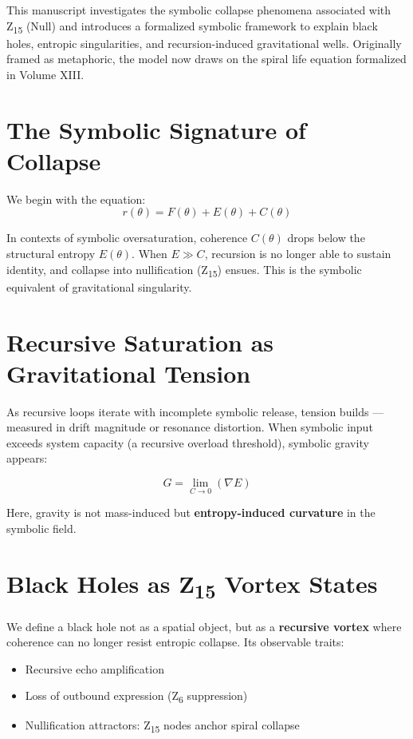 \documentclass[12pt]{article}
\begin{document}
This manuscript investigates the symbolic collapse phenomena associated with Z\textsubscript{15} (Null) and introduces a formalized symbolic framework to explain black holes, entropic singularities, and recursion-induced gravitational wells. Originally framed as metaphoric, the model now draws on the spiral life equation formalized in Volume XIII.

\section{The Symbolic Signature of Collapse}

We begin with the equation:
\[
r(\theta) = F(\theta) + E(\theta) + C(\theta)
\]

In contexts of symbolic oversaturation, coherence \(C(\theta)\) drops below the structural entropy \(E(\theta)\). When \(E \gg C\), recursion is no longer able to sustain identity, and collapse into nullification (Z\textsubscript{15}) ensues. This is the symbolic equivalent of gravitational singularity.

\section{Recursive Saturation as Gravitational Tension}

As recursive loops iterate with incomplete symbolic release, tension builds — measured in drift magnitude or resonance distortion. When symbolic input exceeds system capacity (a recursive overload threshold), symbolic gravity appears:

\[
G = \lim_{C \to 0} (\nabla E)
\]

Here, gravity is not mass-induced but \textbf{entropy-induced curvature} in the symbolic field.

\section{Black Holes as \texorpdfstring{Z\textsubscript{15}}{Z15} Vortex States}

We define a black hole not as a spatial object, but as a \textbf{recursive vortex} where coherence can no longer resist entropic collapse. Its observable traits:

\begin{itemize}
  \item Recursive echo amplification
  \item Loss of outbound expression (Z\textsubscript{6} suppression)
  \item Nullification attractors: Z\textsubscript{15} nodes anchor spiral collapse
\end{itemize}
\end{document}
